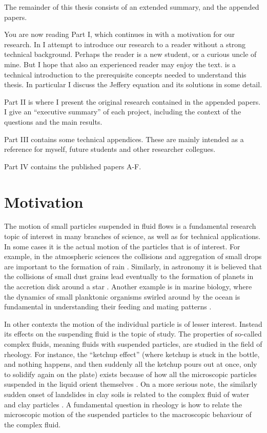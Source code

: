 \documentclass[thesis.tex]{subfiles}
\begin{document}
The remainder of this thesis consists of an extended summary, and the appended papers.

You are now reading Part I, which continues in  with a motivation for our research.
In  I attempt to introduce our research to a reader without a strong technical background. Perhaps the reader is a new student, or a curious uncle of mine. But I hope that also an experienced reader may enjoy the text.
 is a technical introduction to the prerequisite concepts needed to understand this thesis. In particular I discuss the Jeffery equation and its solutions in some detail. 

Part II is where I present the original research contained in the appended papers. I give an ``executive summary'' of each project, including the context of the questions and the main results.

Part III contains some technical appendices. These are mainly intended as a reference for myself, future students and other researcher collegues.

Part IV contains the published papers A-F.


\chapter{Motivation}\label{sec:motivation}

The motion of small particles suspended in fluid flows is a fundamental research topic of interest in many branches of science, as well as for technical applications. In some cases it is the actual motion of the particles that is of interest. For example, in the atmospheric sciences the collisions and aggregation of small drops are important to the formation of rain \cite{devenish2012}. Similarly, in astronomy it is believed that the collisions of small dust grains lead eventually to the formation of planets in the accretion disk around a star \cite{wilkinson2008}. Another example is in marine biology, where the dynamics of small planktonic organisms swirled around by the ocean is fundamental in understanding their feeding and mating patterns \cite{guasto2012}. 

In other contexts the motion of the individual particle is of lesser interest. Instead its effects on the suspending fluid is the topic of study. The properties of so-called complex fluids, meaning fluids with suspended particles, are studied in the field of rheology. For instance, the ``ketchup effect'' (where ketchup is stuck in the bottle, and nothing happens, and then suddenly all the ketchup pours out at once, only to solidify again on the plate) exists because of how all the microscopic particles suspended in the liquid orient themselves \cite{bayod2008}. On a more serious note, the similarly sudden onset of landslides in clay soils is related to the complex fluid of water and clay particles \cite{coussot2002}. A fundamental question in rheology is how to relate the microscopic motion of the suspended particles to the macroscopic behaviour of the complex fluid.
\end{document}
